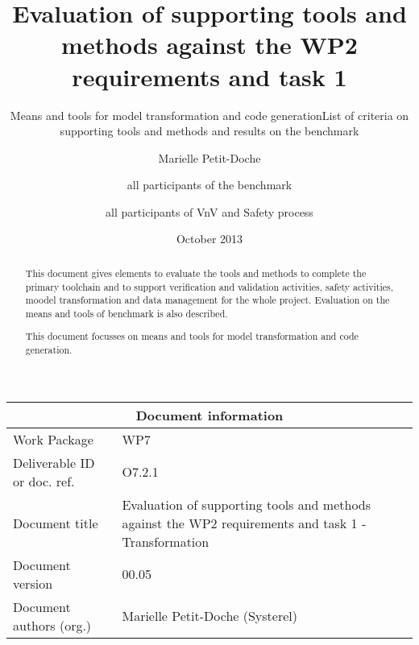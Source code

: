 \documentclass{template/openetcs_report}
\begin{document}
\frontmatter
{}




\title{Evaluation of supporting tools and methods against the WP2 requirements and task 1}

\subtitle{Means and tools for model transformation and code generation}

\subtitle{List of criteria on supporting tools and methods and results on the benchmark}

\date{October 2013}


\author{Marielle Petit-Doche}


\author{all participants of the benchmark}


\author{all participants of VnV  and Safety process}


 


\begin{abstract}
This document gives elements to evaluate the tools and methods to complete the primary toolchain and to support verification and validation activities, safety activities, moodel transformation and data management for the whole project.
 Evaluation on the means and tools of benchmark is also described.

This document focusses on means and tools for model transformation and code generation.
\end{abstract}

\maketitle
\tableofcontents
\listoffiguresandtables
\newpage


\begin{tabular}{|p{4.4cm}|p{8.7cm}|}
\hline
\multicolumn{2}{|c|}{Document information} \\
\hline
Work Package &  WP7  \\
Deliverable ID or doc. ref. & O7.2.1\\
\hline
Document title & Evaluation of supporting tools and methods against the WP2 requirements and task 1 - Transformation \\
Document version & 00.05 \\
Document authors (org.)  & Marielle Petit-Doche (Systerel)  \\
\hline
\end{tabular}
\end{document}
